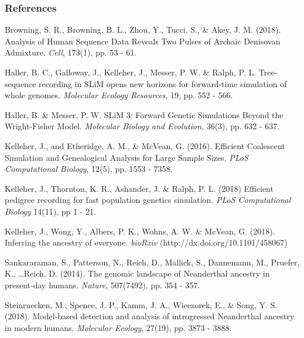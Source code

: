 \documentclass[11pt, mathserif, aspectratio=169]{beamer}
\begin{document}
\begin{frame}[allowframebreaks]
\frametitle{References}
\begin{thebibliography}{10}
\beamertemplatearticlebibitems
{\small
{}
	Browning, S. R., Browning, B. L., Zhou, Y., Tucci, S., \& Akey, J. M. (2018). Analysis of Human Sequence Data Reveals Two Pulses of Archaic Denisovan Admixture. \emph{Cell}, 173(1), pp. 53 - 61.

	Haller, B. C., Galloway, J., Kelleher, J., Messer, P. W. \& Ralph, P. L. Tree-sequence recording in SLiM opens new horizons for forward-time simulation of whole genomes. \emph{Molecular Ecology Resources}, 19, pp. 552 - 566.
	
	Haller, B. \& Messer, P. W. SLiM 3: Forward Genetic Simulations Beyond the Wright-Fisher Model. \emph{Molecular Biology and Evolution}, 36(3), pp. 632 - 637.

	Kelleher, J., and Etheridge, A. M., \& McVean, G. (2016). Efficient Coalescent Simulation and Genealogical Analysis for Large Sample Sizes. \emph{PLoS Computational Biology}, 12(5), pp. 1553 - 7358.
	
	Kelleher, J., Thornton, K. R., Ashander, J. \& Ralph, P. L. (2018) Efficient pedigree recording for fast population genetics simulation. \emph{PLoS Computational Biology} 14(11), pp 1 - 21.
	
	Kelleher, J., Wong, Y., Albers, P. K., Wohns, A. W. \& McVean, G. (2018). Inferring the ancestry of everyone. \emph{bioRxiv} (http://dx.doi.org/10.1101/458067)	
	
	Sankararaman, S., Patterson, N., Reich, D., Mallick, S., Dannemann, M., Pruefer, K., \ldots Reich, D. (2014). The genomic landscape of Neanderthal ancestry in present-day humans. \emph{Nature}, 507(7492), pp. 354 - 357.
	
	Steinruecken, M., Spence, J. P., Kamm, J. A., Wieczorek, E., \& Song, Y. S. (2018). Model-based detection and analysis of introgressed Neanderthal ancestry in modern humans. \emph{Molecular Ecology}, 27(19), pp. 3873 - 3888.
	}
\end{thebibliography}
\end{frame}
\end{document}
